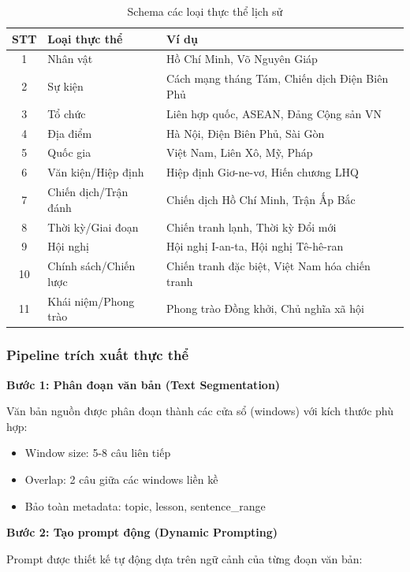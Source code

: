 \begin{table}[H]
\centering
\caption{Schema các loại thực thể lịch sử}
\label{tab:entity-types}
\begin{tabular}{|c|l|l|}
\hline
\textbf{STT} & \textbf{Loại thực thể} & \textbf{Ví dụ} \\
\hline
1 & Nhân vật & Hồ Chí Minh, Võ Nguyên Giáp \\
2 & Sự kiện & Cách mạng tháng Tám, Chiến dịch Điện Biên Phủ \\
3 & Tổ chức & Liên hợp quốc, ASEAN, Đảng Cộng sản VN \\
4 & Địa điểm & Hà Nội, Điện Biên Phủ, Sài Gòn \\
5 & Quốc gia & Việt Nam, Liên Xô, Mỹ, Pháp \\
6 & Văn kiện/Hiệp định & Hiệp định Giơ-ne-vơ, Hiến chương LHQ \\
7 & Chiến dịch/Trận đánh & Chiến dịch Hồ Chí Minh, Trận Ấp Bắc \\
8 & Thời kỳ/Giai đoạn & Chiến tranh lạnh, Thời kỳ Đổi mới \\
9 & Hội nghị & Hội nghị I-an-ta, Hội nghị Tê-hê-ran \\
10 & Chính sách/Chiến lược & Chiến tranh đặc biệt, Việt Nam hóa chiến tranh \\
11 & Khái niệm/Phong trào & Phong trào Đồng khởi, Chủ nghĩa xã hội \\
\hline
\end{tabular}
\end{table}

\subsubsection{Pipeline trích xuất thực thể}

\textbf{Bước 1: Phân đoạn văn bản (Text Segmentation)}

Văn bản nguồn được phân đoạn thành các cửa sổ (windows) với kích thước phù hợp:
\begin{itemize}
    \item Window size: 5-8 câu liên tiếp
    \item Overlap: 2 câu giữa các windows liền kề
    \item Bảo toàn metadata: topic, lesson, sentence\_range
\end{itemize}

\textbf{Bước 2: Tạo prompt động (Dynamic Prompting)}

Prompt được thiết kế tự động dựa trên ngữ cảnh của từng đoạn văn bản:

